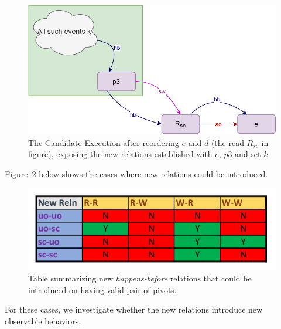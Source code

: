     \begin{figure}[H]
        \centering
        \includegraphics[scale=0.7]{4.InstructionReordering/4.ValidReorderingCandidate/ProofParts/Part2/part2(d).pdf}
        \caption{The Candidate Execution after reordering $e$ and $d$ (the read $R_{sc}$ in figure), exposing the new relations established with $e$, $p3$ and set $k$}
        \label{reord:add_reln(b)}
    \end{figure}

    Figure~\ref{reord:add_reln_table} below shows the cases where new relations could be introduced. 
    \begin{figure}[H]
        \centering
        \includegraphics[scale=0.7]{4.InstructionReordering/4.ValidReorderingCandidate/ProofParts/Part2/part2_table.pdf}
        \caption{Table summarizing new \textit{happens-before} relations that could be introduced on having valid pair of pivots.}
        \label{reord:add_reln_table}
    \end{figure}

    For these cases, we investigate whether the new relations introduce new observable behaviors. 
